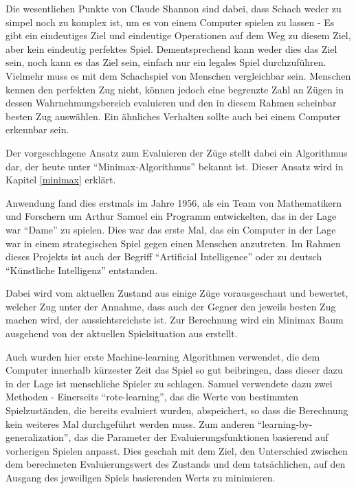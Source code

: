 Die wesentlichen Punkte von Claude Shannon sind dabei, dass Schach weder zu simpel noch zu komplex ist, um es von einem Computer spielen zu lassen - Es gibt ein eindeutiges Ziel und eindeutige Operationen auf dem Weg zu diesem Ziel, aber kein eindeutig perfektes Spiel. Dementsprechend kann weder dies das Ziel sein, noch kann es das Ziel sein, einfach nur ein legales Spiel durchzuführen. Vielmehr muss es mit dem Schachspiel von Menschen vergleichbar sein. Menschen kennen den perfekten Zug nicht, können jedoch eine begrenzte Zahl an Zügen in dessen Wahrnehmungsbereich evaluieren und den in diesem Rahmen scheinbar besten Zug auswählen. Ein ähnliches Verhalten sollte auch bei einem Computer erkennbar sein.

Der vorgeschlagene Ansatz zum Evaluieren der Züge stellt dabei ein Algorithmus dar, der heute unter ``Minimax-Algorithmus'' bekannt ist. Dieser Ansatz wird in Kapitel \ref{minimax} erklärt.


Anwendung fand dies erstmals im Jahre 1956, als ein Team von Mathematikern und Forschern um Arthur Samuel ein Programm entwickelten, das in der Lage war ``Dame'' zu spielen. Dies war das erste Mal, das ein Computer in der Lage war in einem strategischen Spiel gegen einen Menschen anzutreten. Im Rahmen dieses Projekts ist auch der Begriff ``Artificial Intelligence'' oder zu deutsch ``Künstliche Intelligenz'' entstanden. \cite{Kurenkov2019}

Dabei wird vom aktuellen Zustand aus einige Züge vorausgeschaut und bewertet, welcher Zug unter der Annahme, dass auch der Gegner den jeweils besten Zug machen wird, der aussichtsreichste ist. Zur Berechnung wird ein Minimax Baum ausgehend von der aktuellen Spielsituation aus erstellt.


Auch wurden hier erste Machine-learning Algorithmen verwendet, die dem Computer innerhalb kürzester Zeit das Spiel so gut beibringen, dass dieser dazu in der Lage ist menschliche Spieler zu schlagen. Samuel verwendete dazu zwei Methoden - Einerseits ``rote-learning'', das die Werte von bestimmten Spielzuständen, die bereits evaluiert wurden, abspeichert, so dass die Berechnung kein weiteres Mal durchgeführt werden muss. Zum anderen ``learning-by-generalization'', das die Parameter der Evaluierungsfunktionen basierend auf vorherigen Spielen anpasst. Dies geschah mit dem Ziel, den Unterschied zwischen dem berechneten Evaluierungswert des Zustands und dem tatsächlichen, auf den Ausgang des jeweiligen Spiels basierenden Werts zu minimieren. \cite{Samuel1959}

